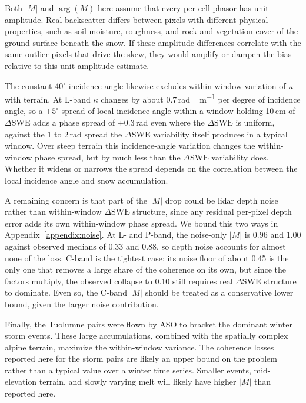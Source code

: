 \documentclass[tc, manuscript]{copernicus}
\begin{document}
Both $|M|$ and $\arg(M)$ here assume that every per-cell phasor has unit amplitude. Real backscatter differs between pixels with different physical properties, such as soil moisture, roughness, and rock and vegetation cover of the ground surface beneath the snow. If these amplitude differences correlate with the same outlier pixels that drive the skew, they would amplify or dampen the bias relative to this unit-amplitude estimate.

The constant 40$^{\circ}$ incidence angle likewise excludes within-window variation of $\kappa$ with terrain. At L-band $\kappa$ changes by about 0.7\,\unit{rad\,m^{-1}} per degree of incidence angle, so a $\pm5^{\circ}$ spread of local incidence angle within a window holding 10\,\unit{cm} of $\Delta\mathrm{SWE}$ adds a phase spread of $\pm0.3$\,\unit{rad} even where the $\Delta\mathrm{SWE}$ is uniform, against the 1 to 2\,\unit{rad} spread the $\Delta\mathrm{SWE}$ variability itself produces in a typical window. Over steep terrain this incidence-angle variation changes the within-window phase spread, but by much less than the $\Delta\mathrm{SWE}$ variability does. Whether it widens or narrows the spread depends on the correlation between the local incidence angle and snow accumulation.

A remaining concern is that part of the $|M|$ drop could be lidar depth noise rather than within-window $\Delta\mathrm{SWE}$ structure, since any residual per-pixel depth error adds its own within-window phase spread. We bound this two ways in Appendix~\ref{appendix:noise}. At L- and P-band, the noise-only $|M|$ is 0.96 and 1.00 against observed medians of 0.33 and 0.88, so depth noise accounts for almost none of the loss. C-band is the tightest case: its noise floor of about 0.45 is the only one that removes a large share of the coherence on its own, but since the factors multiply, the observed collapse to 0.10 still requires real $\Delta\mathrm{SWE}$ structure to dominate. Even so, the C-band $|M|$ should be treated as a conservative lower bound, given the larger noise contribution.

Finally, the Tuolumne pairs were flown by ASO to bracket the dominant winter storm events. These large accumulations, combined with the spatially complex alpine terrain, maximize the within-window variance. The coherence losses reported here for the storm pairs are likely an upper bound on the problem rather than a typical value over a winter time series. Smaller events, mid-elevation terrain, and slowly varying melt will likely have higher $|M|$ than reported here.
\end{document}

